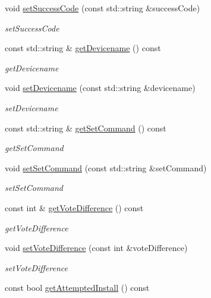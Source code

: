 \begin{DoxyCompactItemize}
void \hyperlink{classDevice_ae70b727a6230454baccc6da6cfd819a7}{set\+Success\+Code} (const std\+::string \&success\+Code)
\begin{DoxyCompactList}\small\item\em set\+Success\+Code \end{DoxyCompactList}\item 
const std\+::string \& \hyperlink{classDevice_a7c1221950b9ec064b023c4033454774a}{get\+Devicename} () const
\begin{DoxyCompactList}\small\item\em get\+Devicename \end{DoxyCompactList}\item 
void \hyperlink{classDevice_ad1f6005dcab32855477814fa9533315d}{set\+Devicename} (const std\+::string \&devicename)
\begin{DoxyCompactList}\small\item\em set\+Devicename \end{DoxyCompactList}\item 
const std\+::string \& \hyperlink{classDevice_a3c0a93766217f57848cf6871aeb9ffc2}{get\+Set\+Command} () const
\begin{DoxyCompactList}\small\item\em get\+Set\+Command \end{DoxyCompactList}\item 
void \hyperlink{classDevice_afad48633a288b303f88f7d607c64cca3}{set\+Set\+Command} (const std\+::string \&set\+Command)
\begin{DoxyCompactList}\small\item\em set\+Set\+Command \end{DoxyCompactList}\item 
const int \& \hyperlink{classDevice_abbf7d73cde4dc08996414956fc25188d}{get\+Vote\+Difference} () const
\begin{DoxyCompactList}\small\item\em get\+Vote\+Difference \end{DoxyCompactList}\item 
void \hyperlink{classDevice_acf378aa086771dd7c64626abb8a74821}{set\+Vote\+Difference} (const int \&vote\+Difference)
\begin{DoxyCompactList}\small\item\em set\+Vote\+Difference \end{DoxyCompactList}\item 
const bool \hyperlink{classDevice_a068c25d48712783fd0dc759d4505c615}{get\+Attempted\+Install} () const

\end{DoxyCompactItemize}
